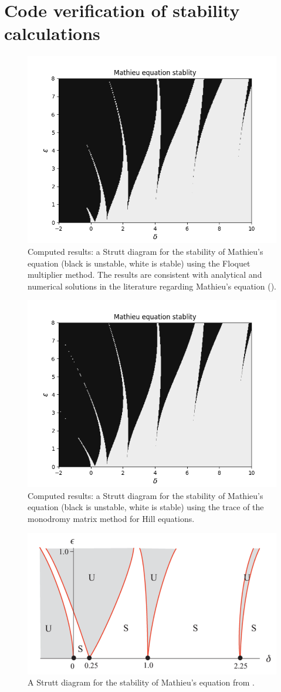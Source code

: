 \documentclass{article}
\begin{document}
\newpage
\section*{Code verification of stability calculations}
\begin{figure}[h!]
\centering
\includegraphics[width=4.5in]{strutt_eig_rk4.png}
\caption{Computed results: a Strutt diagram for the stability of Mathieu's equation (black is unstable, white is 
stable) using the Floquet multiplier method. The results are consistent with analytical 
and numerical solutions in the literature regarding Mathieu's equation (\citet{Kovacic18}).
}
\end{figure}
\begin{figure}[h!]
\centering
\includegraphics[width=4.5in]{strutt_Tr_rk4.png}
\caption{Computed results: a Strutt diagram for the stability of Mathieu's equation (black is unstable, white is 
stable) using the trace of the monodromy matrix method for Hill equations.
}
\end{figure}

\begin{figure}[h!]
\centering
\includegraphics[width=4.5in]{fig3_Kovacic_2018.png}
\caption{A Strutt diagram for the stability of Mathieu's equation from \citet{Kovacic18}.
}
\end{figure}

\newpage
 
\end{document}
